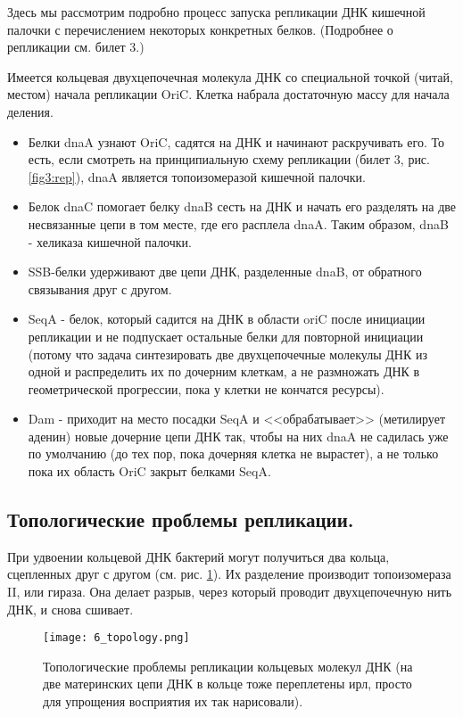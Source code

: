 Здесь мы рассмотрим подробно процесс запуска репликации ДНК кишечной палочки с перечислением некоторых конкретных белков. (Подробнее о репликации см. билет 3.)

Имеется кольцевая двухцепочечная молекула ДНК со специальной точкой (читай, местом) начала репликации OriC. Клетка набрала достаточную массу для начала деления. 

\begin{itemize}
    \item Белки dnaA узнают OriC, садятся на ДНК и начинают раскручивать его. То есть, если смотреть на принципиальную схему репликации (билет 3, рис. \ref{fig3:rep}), dnaA является топоизомеразой кишечной палочки.
    
    \item Белок dnaC помогает белку dnaB сесть на ДНК и начать его разделять на две несвязанные цепи в том месте, где его расплела dnaA. Таким образом, dnaB - хеликаза кишечной палочки.
    
    \item SSB-белки удерживают две цепи ДНК, разделенные dnaB, от обратного связывания друг с другом.
    
    \item SeqA - белок, который садится на ДНК в области oriC после инициации репликации и не подпускает остальные белки для повторной инициации (потому что задача синтезировать две двухцепочечные молекулы ДНК из одной и распределить их по дочерним клеткам, а не размножать ДНК в геометрической прогрессии, пока у клетки не кончатся ресурсы).
    
    \item Dam - приходит на место посадки SeqA и <<обрабатывает>> (метилирует аденин) новые дочерние цепи ДНК так, чтобы на них dnaA не садилась уже по умолчанию (до тех пор, пока дочерняя клетка не вырастет), а не только пока их область OriC закрыт белками SeqA.
\end{itemize}

\subsection{Топологические проблемы репликации.}

При удвоении кольцевой ДНК бактерий могут получиться два кольца, сцепленных друг с другом (см. рис. \ref{fig:6_topology}). Их разделение производит топоизомераза II, или гираза. Она делает разрыв, через который проводит двухцепочечную нить ДНК, и снова сшивает.

\begin{figure}[h!]
    \centering
    \texttt{[image: 6\_topology.png]}
    \caption{Топологические проблемы репликации кольцевых молекул ДНК (на две материнских цепи ДНК в кольце тоже переплетены ирл, просто для упрощения восприятия их так нарисовали).}
    \label{fig:6_topology}
\end{figure}

